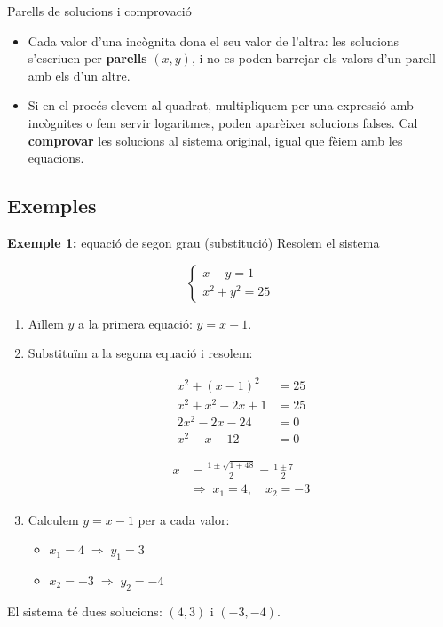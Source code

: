 \begin{nota}{Parells de solucions i comprovació}
\begin{itemize}
\item Cada valor d'una incògnita dona el seu valor de l'altra: les solucions s'escriuen per \textbf{parells} $(x,y)$, i no es poden barrejar els valors d'un parell amb els d'un altre.
\item Si en el procés elevem al quadrat, multipliquem per una expressió amb incògnites o fem servir logaritmes, poden aparèixer solucions falses. Cal \textbf{comprovar} les solucions al sistema original, igual que fèiem amb les equacions.
\end{itemize}
\end{nota}

\subsection{Exemples}

\begin{exemple}{\textbf{Exemple 1:} equació de segon grau (substitució)}
Resolem el sistema

\[
\begin{cases}
x-y=1\\
x^2+y^2=25
\end{cases}
\]

\begin{enumerate}
\item Aïllem $y$ a la primera equació: $y=x-1$.
\item Substituïm a la segona equació i resolem:

\[
\begin{aligned}
x^2+(x-1)^2&=25\\
x^2+x^2-2x+1&=25\\
2x^2-2x-24&=0\\
x^2-x-12&=0
\end{aligned}
\]

\[
\begin{aligned}x&=\frac{1\pm\sqrt{1+48}}{2}=\frac{1\pm 7}{2}\\ &\Rightarrow\; x_1=4,\quad x_2=-3\end{aligned}
\]
\item Calculem $y=x-1$ per a cada valor:

\begin{itemize}
\item $x_1=4 \;\Rightarrow\; y_1=3$
\item $x_2=-3 \;\Rightarrow\; y_2=-4$
\end{itemize}
\end{enumerate}

El sistema té dues solucions: $(4,3)$ i $(-3,-4)$.
\end{exemple}

